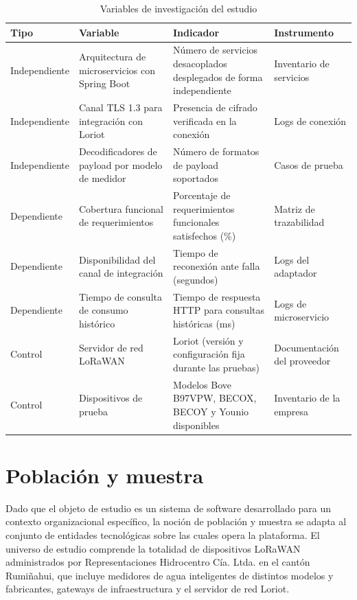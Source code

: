 \documentclass[12pt,a4paper,oneside]{report}
\begin{document}
\begin{table}[H]
\caption{Variables de investigación del estudio}
\label{tab:variables}
\centering
\begin{tabularx}{\textwidth}{lXXl}
\toprule
\textbf{Tipo} & \textbf{Variable} & \textbf{Indicador} & \textbf{Instrumento} \\
\midrule
Independiente & Arquitectura de microservicios con Spring Boot & Número de servicios desacoplados desplegados de forma independiente & Inventario de servicios \\
Independiente & Canal TLS 1.3 para integración con Loriot & Presencia de cifrado verificada en la conexión & Logs de conexión \\
Independiente & Decodificadores de payload por modelo de medidor & Número de formatos de payload soportados & Casos de prueba \\
Dependiente & Cobertura funcional de requerimientos & Porcentaje de requerimientos funcionales satisfechos (\%) & Matriz de trazabilidad \\
Dependiente & Disponibilidad del canal de integración & Tiempo de reconexión ante falla (segundos) & Logs del adaptador \\
Dependiente & Tiempo de consulta de consumo histórico & Tiempo de respuesta HTTP para consultas históricas (ms) & Logs de microservicio \\
Control & Servidor de red LoRaWAN & Loriot (versión y configuración fija durante las pruebas) & Documentación del proveedor \\
Control & Dispositivos de prueba & Modelos Bove B97VPW, BECOX, BECOY y Younio disponibles & Inventario de la empresa \\
\bottomrule
\end{tabularx}
\end{table}

\section{Población y muestra}

Dado que el objeto de estudio es un sistema de software desarrollado para un contexto organizacional específico, la noción de población y muestra se adapta al conjunto de entidades tecnológicas sobre las cuales opera la plataforma. El universo de estudio comprende la totalidad de dispositivos LoRaWAN administrados por Representaciones Hidrocentro Cía. Ltda. en el cantón Rumiñahui, que incluye medidores de agua inteligentes de distintos modelos y fabricantes, gateways de infraestructura y el servidor de red Loriot.
\end{document}
